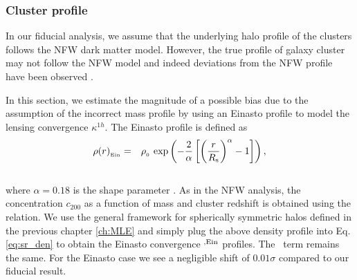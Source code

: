  \subsubsection{Cluster profile}\label{subsec_clusprofile}
In our fiducial analysis, we assume that the underlying halo profile of the clusters follows the NFW dark matter model. 
However, the true profile of galaxy cluster may not follow the NFW model and indeed 
deviations from the NFW profile have been observed \citep{diemer14,child18}. %

In this section, we estimate the magnitude of a possible bias due to the assumption of the incorrect mass profile by using an Einasto profile \citep{einasto89} to model the lensing convergence $\kappa^{1h}$.
The Einasto profile is defined as
\begin{eqnarray}
\rho(r)_{_{\rm Ein}} & = &  \rho_{_{0}}\ \mbox{exp}\left( - \frac{2}{\alpha} \left[\left(\frac{r}{R_{\rm s}} \right)^{\alpha} - 1\right]\right),
\label{eq_einasto_density}
\end{eqnarray}\\
where $\alpha = 0.18$ is the shape parameter \citep{ludlow13}. 
As in the NFW analysis, the concentration $c_{200}$ as a function of mass and cluster redshift is obtained using the \citet{duffy08} relation.
We use the general framework for spherically symmetric halos defined in the previous chapter \ref{ch:MLE} and simply plug the above density profile into Eq. \ref{eq:sr_den} to obtain the Einasto convergence \kappaonehalo$^{,\rm Ein}$ profiles. The \kappatwohalo\ term remains the same. For the Einasto case we see a negligible shift of $0.01\sigma$ compared to our fiducial result.
